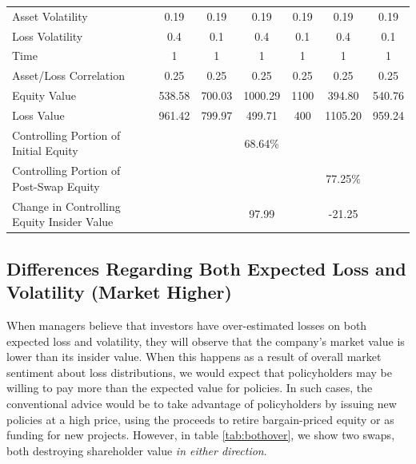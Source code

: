 \begin{table}
\begin{center}
\begin{tabular}{p{2in}cccccc}
Asset Volatility &       0.19 &       0.19 &       0.19 &       0.19 &       0.19 &       0.19 \\ 

Loss Volatility &        0.4 &        0.1 &        0.4 &        0.1 &        0.4 &        0.1 \\ 

      Time &          1 &          1 &          1 &          1 &          1 &          1 \\ 
      
Asset/Loss Correlation &       0.25 &       0.25 &       0.25 &       0.25 &       0.25 &       0.25 \\ 

\midrule

Equity Value & 538.58 &    700.03 &   1000.29 &       1100 &    394.80 &    540.76 \\ 

Loss Value & 961.42 &    799.97 &   499.71 &        400 &   1105.20 &    959.24\\ 

\midrule

Controlling Portion of Initial Equity &            &            &   68.64\% &            &            &            \\ 

Controlling Portion of Post-Swap Equity &            &            &            &            &   77.25\% &            \\ 

\midrule

Change in Controlling Equity Insider Value &            &            &   97.99 &            &   -21.25 &            \\ 
\bottomrule

\end{tabular}  
\end{center}
\end{table}

\subsection{Differences Regarding Both Expected Loss and Volatility (Market Higher)}

When managers believe that investors have over-estimated losses on both expected loss and volatility, they will observe that the company's market value is lower than its insider value.  When this happens as a result of overall market sentiment about loss distributions, we would expect that policyholders may be willing to pay more than the expected value for policies.  In such cases, the conventional advice would be to take advantage of policyholders by issuing new policies at a high price, using the proceeds to retire bargain-priced equity or as funding for new projects. However, in table \ref{tab:bothover}, we show two swaps, both destroying shareholder value \textit{in either direction}.  

